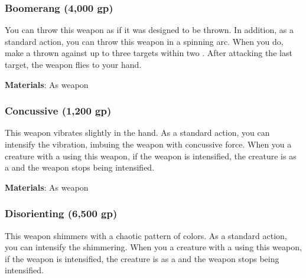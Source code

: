 
\lowercase{\hypertarget{item:Boomerang}{}}\label{item:Boomerang}
\hypertarget{item:Boomerang}{\subsubsection{Boomerang\hfill{} (4,000 gp)}}

You can throw this weapon as if it was designed to be thrown.
In addition, as a standard action, you can throw this weapon in a spinning arc.
When you do, make a thrown  against up to three targets within two .
After attacking the last target, the weapon flies to your hand.



\vspace{0.25em}
\textbf{Materials}: As weapon


\lowercase{\hypertarget{item:Concussive}{}}\label{item:Concussive}
\hypertarget{item:Concussive}{\subsubsection{Concussive\hfill{} (1,200 gp)}}

This weapon vibrates slightly in the hand.
As a standard action, you can intensify the vibration, imbuing the weapon with concussive force.
When you  a creature with a  using this weapon, if the weapon is intensified,
the creature is  as a  and the weapon stops being intensified.



\vspace{0.25em}
\textbf{Materials}: As weapon


\lowercase{\hypertarget{item:Disorienting}{}}\label{item:Disorienting}
\hypertarget{item:Disorienting}{\subsubsection{Disorienting\hfill{} (6,500 gp)}}

This weapon shimmers with a chaotic pattern of colors.
As a standard action, you can intensify the shimmering.
When you  a creature with a  using this weapon, if the weapon is intensified,
the creature is  as a  and the weapon stops being intensified.



